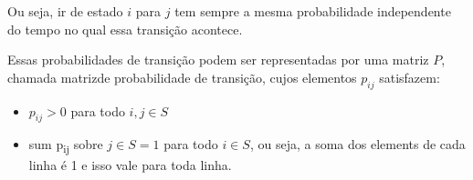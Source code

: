 \documentclass[11pt]{article}
\begin{document}
Ou seja, ir de estado \(i\) para \(j\) tem sempre a mesma probabilidade independente do tempo no qual essa transição acontece.

Essas probabilidades de transição podem ser representadas por uma matriz \(P\), chamada matrizde probabilidade de transição, cujos elementos \(p_{ij}\) satisfazem:

\begin{itemize}
\item \(p_{ij} > 0\) para todo \(i, j \in S\)
\item sum p\textsubscript{ij} sobre \(j \in S = 1\) para todo \(i \in S\), ou seja, a soma dos elements de cada linha é 1 e isso vale para toda linha.
\end{itemize}
\end{document}
